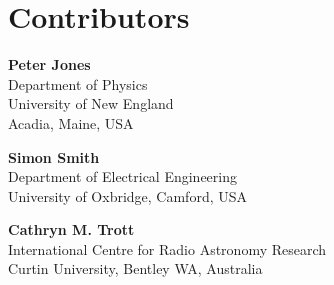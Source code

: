 
\chapter*{Contributors}
 


{\parskip=12pt

\noindent\textbf{Peter Jones}\\
Department of Physics\\
University of New England\\
Acadia, Maine, USA

\noindent\textbf{Simon Smith}\\
Department of Electrical Engineering\\
University of Oxbridge, 
Camford, USA

\noindent\textbf{Cathryn M. Trott}\\
International Centre for Radio Astronomy Research\\
Curtin University, Bentley WA, Australia

}

